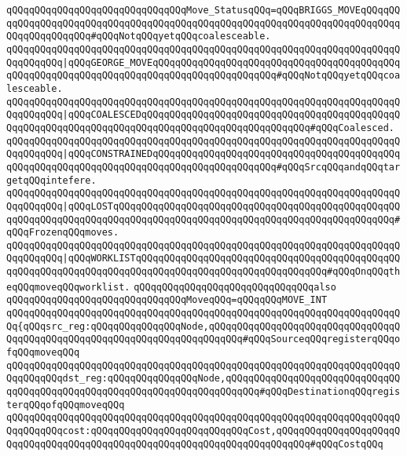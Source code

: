 \verb|qQQqqQQqqQQqqQQqqQQqqQQqqQQqqQQqMove_StatusqQQq=qQQqBRIGGS_MOVEqQQqqQQqqQQqqQQqqQQqqQQqqQQqqQQqqQQqqQQqqQQqqQQqqQQqqQQqqQQqqQQqqQQqqQQqqQQqqQQqqQQqqQQqqQQq#qQQqNotqQQqyetqQQqcoalesceable.|\newline
\verb|qQQqqQQqqQQqqQQqqQQqqQQqqQQqqQQqqQQqqQQqqQQqqQQqqQQqqQQqqQQqqQQqqQQqqQQqqQQqqQQq|\verb#|qQQqGEORGE_MOVEqQQqqQQqqQQqqQQqqQQqqQQqqQQqqQQqqQQqqQQqqQQqqQQqqQQqqQQqqQQqqQQqqQQqqQQqqQQqqQQqqQQqqQQqqQQq#\verb|#qQQqNotqQQqyetqQQqcoalesceable.|\newline
\verb|qQQqqQQqqQQqqQQqqQQqqQQqqQQqqQQqqQQqqQQqqQQqqQQqqQQqqQQqqQQqqQQqqQQqqQQqqQQqqQQq|\verb#|qQQqCOALESCEDqQQqqQQqqQQqqQQqqQQqqQQqqQQqqQQqqQQqqQQqqQQqqQQqqQQqqQQqqQQqqQQqqQQqqQQqqQQqqQQqqQQqqQQqqQQqqQQqqQQq#\verb|#qQQqCoalesced.|\newline
\verb|qQQqqQQqqQQqqQQqqQQqqQQqqQQqqQQqqQQqqQQqqQQqqQQqqQQqqQQqqQQqqQQqqQQqqQQqqQQqqQQq|\verb#|qQQqCONSTRAINEDqQQqqQQqqQQqqQQqqQQqqQQqqQQqqQQqqQQqqQQqqQQqqQQqqQQqqQQqqQQqqQQqqQQqqQQqqQQqqQQqqQQqqQQqqQQq#\verb|#qQQqSrcqQQqandqQQqtargetqQQqintefere.|\newline
\verb|qQQqqQQqqQQqqQQqqQQqqQQqqQQqqQQqqQQqqQQqqQQqqQQqqQQqqQQqqQQqqQQqqQQqqQQqqQQqqQQq|\verb#|qQQqLOSTqQQqqQQqqQQqqQQqqQQqqQQqqQQqqQQqqQQqqQQqqQQqqQQqqQQqqQQqqQQqqQQqqQQqqQQqqQQqqQQqqQQqqQQqqQQqqQQqqQQqqQQqqQQqqQQqqQQqqQQq#\verb|#qQQqFrozenqQQqmoves.|\newline
\verb|qQQqqQQqqQQqqQQqqQQqqQQqqQQqqQQqqQQqqQQqqQQqqQQqqQQqqQQqqQQqqQQqqQQqqQQqqQQqqQQq|\verb#|qQQqWORKLISTqQQqqQQqqQQqqQQqqQQqqQQqqQQqqQQqqQQqqQQqqQQqqQQqqQQqqQQqqQQqqQQqqQQqqQQqqQQqqQQqqQQqqQQqqQQqqQQqqQQqqQQq#\verb|#qQQqOnqQQqtheqQQqmoveqQQqworklist.|\newline
\newline
\verb|qQQqqQQqqQQqqQQqqQQqqQQqqQQqqQQqalso|\newline
\verb|qQQqqQQqqQQqqQQqqQQqqQQqqQQqqQQqMoveqQQq=qQQqqQQqMOVE_INT|\newline
\verb|qQQqqQQqqQQqqQQqqQQqqQQqqQQqqQQqqQQqqQQqqQQqqQQqqQQqqQQqqQQqqQQqqQQqqQQq{qQQqsrc_reg:qQQqqQQqqQQqqQQqNode,qQQqqQQqqQQqqQQqqQQqqQQqqQQqqQQqqQQqqQQqqQQqqQQqqQQqqQQqqQQqqQQqqQQqqQQqqQQq#qQQqSourceqQQqregisterqQQqofqQQqmoveqQQq|\newline
\verb|qQQqqQQqqQQqqQQqqQQqqQQqqQQqqQQqqQQqqQQqqQQqqQQqqQQqqQQqqQQqqQQqqQQqqQQqqQQqqQQqdst_reg:qQQqqQQqqQQqqQQqNode,qQQqqQQqqQQqqQQqqQQqqQQqqQQqqQQqqQQqqQQqqQQqqQQqqQQqqQQqqQQqqQQqqQQqqQQqqQQq#qQQqDestinationqQQqregisterqQQqofqQQqmoveqQQq|\newline
\verb|qQQqqQQqqQQqqQQqqQQqqQQqqQQqqQQqqQQqqQQqqQQqqQQqqQQqqQQqqQQqqQQqqQQqqQQqqQQqqQQqcost:qQQqqQQqqQQqqQQqqQQqqQQqqQQqCost,qQQqqQQqqQQqqQQqqQQqqQQqqQQqqQQqqQQqqQQqqQQqqQQqqQQqqQQqqQQqqQQqqQQqqQQqqQQq#qQQqCostqQQq|\newline

